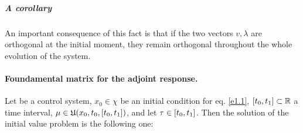 \subparagraph[4.6]{A corollary}An important consequence of this fact is that if the two vectors $v,\lambda$ are orthogonal at the initial moment, they remain orthogonal throughout the whole evolution of the system. 


\paragraph[prop 4.7]{Foundamental matrix for the adjoint response.}
\begin{teo}
	Let \controlSystem\space be a control system, $x_0\in\chi$ be an initial condition for eq. \eqref{e1.1}, $[t_0,t_1]\subset\mathbb{R}$ a time interval, $\mu\in\mathfrak{U}(x_0,t_0,[t_0,t_1])$, and let $\tau\in[t_0,t_1]$. Then the solution of the initial value problem 
is the following one:
\end{teo}